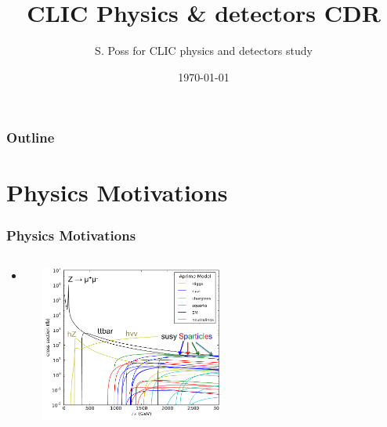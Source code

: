 \documentclass{beamer}
\author{S. Poss for CLIC physics and detectors study}
\institute[CERN]{CERN}
\title[]{CLIC Physics \& detectors CDR}
\date{\today}
\begin{document}
{

\begin{frame}
	\titlepage
\end{frame}

\begin{frame}
\frametitle{Outline}
\tableofcontents
\end{frame}
}

\section{Physics Motivations}
\begin{frame}
\frametitle{Physics Motivations}
\begin{columns}[c]
\column{6cm}
\begin{itemize} 
  \item 
\end{itemize}
\column{6cm}
\includegraphics[width=6cm]{models}
\end{columns}
\end{frame}
\end{document}
